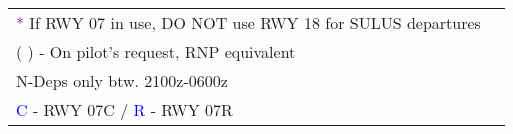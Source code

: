 \documentclass[10pt,landscape,a4paper]{article}
\begin{document}
\begin{textblock}{2}
\begin{table}[]
\begin{tabular}{|c|l|c|c|c|c|c|c|l}
      \multicolumn{8}{l}{\textcolor{purple}{*} If RWY 07 in use, DO NOT use RWY 18 for SULUS departures}                                                                                                                                                                                                                                                                                                                      \\
      \multicolumn{6}{l}{( ) ‐ On pilot’s request, RNP equivalent}                                                                                                                                                                                                                                                                                                                                                            \\
      \multicolumn{6}{l}{N-Deps only btw. 2100z-0600z}                                                                                                                                                                                                                                                                                                                                                                        \\
      \multicolumn{6}{l}{\textcolor{blue}{C} - RWY 07C / \textcolor{blue}{R} - RWY 07R}                                                                                                                                                                                                                                                                                                                                       \\
    \end{tabular}
  \end{table}

\end{textblock}
\end{document}
